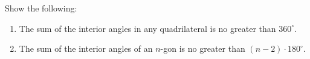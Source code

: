 \begin{question}
Show the following:
\begin{enumerate}
\item The sum of the interior angles in any quadrilateral is no greater than $360^\circ$.
\item The sum of the interior angles of an $n$-gon is no greater than
$\left( n-2\right)\cdot180^\circ$.
\end{enumerate}
\end{question}
